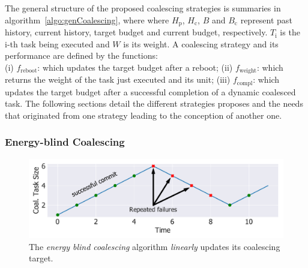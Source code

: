 



The general structure of the proposed coalescing strategies is summaries in algorithm~\ref{algo:genCoalescing}, where where $H_\text{p}$, $H_\text{c}$, $B$ and $B_\text{c}$ represent past history, current history, target budget and current budget, respectively. $T_\text{i}$ is the i-th task being executed and $W$ is its weight.
A coalescing strategy and its performance are defined by the functions: \\
(i) \emph{$f_\text{reboot}$}: which updates the target budget after a reboot; (ii) \emph{$f_\text{weight}$}: which returns the weight of the task just executed and its unit; (iii) \emph{$f_\text{compl}$}: which updates the target budget after a successful completion of a dynamic coalesced task. The following sections detail the different strategies \sys proposes and the needs that originated from one strategy leading to the conception of another one.

\subsubsection{Energy-blind Coalescing}
\label{subsec:energyBlind}

\begin{figure}
	\centering
	\includegraphics[width=0.5\columnwidth]{figures/slowCoal}
	\caption{The {\em energy blind coalescing} algorithm \emph{linearly} updates its coalescing target.}
	\label{fig:slowCoal}
\end{figure}

